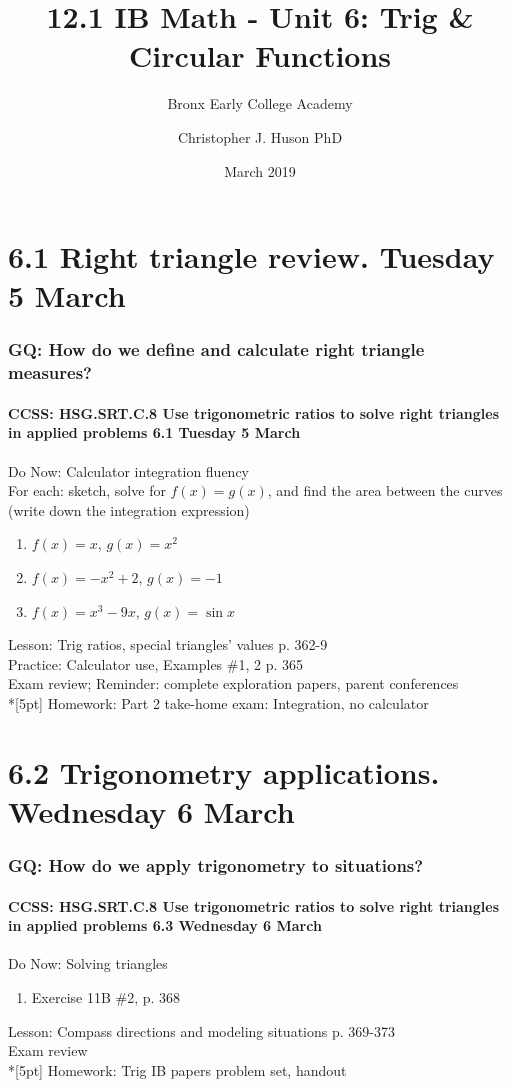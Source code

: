 \documentclass{beamer}
\title{12.1 IB Math - Unit 6: Trig \& Circular Functions}
\subtitle{Bronx Early College Academy}
\author{Christopher J. Huson PhD}
\date{March 2019}
\begin{document}
\frame{\titlepage}

\section[Outline]{}
\frame{\tableofcontents}

\section{6.1 Right triangle review. Tuesday 5 March}
  \frame
  {
    \frametitle{GQ: How do we define and calculate right triangle measures?}
    \framesubtitle{CCSS: HSG.SRT.C.8 Use trigonometric ratios to solve right triangles in applied problems \hfill \alert{6.1 Tuesday 5 March}}

    \begin{block}{Do Now: Calculator integration fluency\\For each: sketch, solve for $f(x)=g(x)$, and find the area between the curves (write down the integration expression)}
      \begin{enumerate}
        \item $f(x)=x$, $g(x)=x^2$
        \item $f(x)=-x^2+2$, $g(x)=-1$
        \item $f(x)=x^3-9x$, $g(x)=\sin x$
      \end{enumerate}
      \end{block}
    Lesson: Trig ratios, special triangles' values p. 362-9\\
    Practice: Calculator use, Examples \#1, 2  p. 365\\
    Exam review;
    Reminder: complete exploration papers, \alert{parent conferences} \\*[5pt]
    Homework: Part 2 take-home exam: Integration, no calculator
  }

\section{6.2 Trigonometry applications. Wednesday 6 March}
  \frame
  {
    \frametitle{GQ: How do we apply trigonometry to situations?}
    \framesubtitle{CCSS: HSG.SRT.C.8 Use trigonometric ratios to solve right triangles in applied problems \hfill \alert{6.3 Wednesday 6 March}}

    \begin{block}{Do Now: Solving triangles}
    \begin{enumerate}
        \item Exercise 11B \#2, p. 368
    \end{enumerate}
    \end{block}
    Lesson: Compass directions and modeling situations p. 369-373\\
    Exam review\\*[5pt]
    Homework: Trig IB papers problem set, handout
  }
\end{document}
